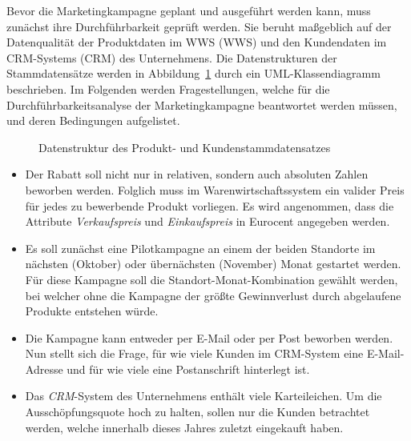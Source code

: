 \documentclass[
  language=german, %
  type=bachelor,%
  ngerman
]{isthesis}
\begin{document}
\begin{content}
  Bevor die Marketingkampagne geplant und ausgeführt werden kann, muss zunächst
  ihre Durchführbarkeit geprüft werden. Sie beruht maßgeblich auf der
  Datenqualität der Produktdaten im \acrlong{WWS} (\acrshort{WWS}) und den
  Kundendaten im \acrlong{CRM}-Systems (\acrshort{CRM}) des Unternehmens. Die
  Datenstrukturen der Stammdatensätze werden in
  Abbildung~\ref{example-use-case-data} durch ein UML-Klassendiagramm
  beschrieben. Im Folgenden werden Fragestellungen, welche für die
  Durchführbarkeitsanalyse der Marketingkampagne beantwortet werden müssen, und
  deren Bedingungen aufgelistet.

  \begin{figure}
    \resizebox{250pt}{!}{}
    \caption{Datenstruktur des Produkt- und Kundenstammdatensatzes}\label{example-use-case-data}
  \end{figure}

  \begin{itemize}

    \item Der Rabatt soll nicht nur in relativen, sondern auch absoluten Zahlen
      beworben werden. Folglich muss im Warenwirtschaftssystem ein valider
      Preis für jedes zu bewerbende Produkt vorliegen. Es wird angenommen, dass
      die Attribute \textit{Verkaufspreis} und \textit{Einkaufspreis} in
      Eurocent angegeben werden.

    \item Es soll zunächst eine Pilotkampagne an einem der beiden Standorte im
      nächsten (Oktober) oder übernächsten (November) Monat gestartet werden.
      Für diese Kampagne soll die Standort-Monat-Kombination gewählt werden,
      bei welcher ohne die Kampagne der größte Gewinnverlust durch abgelaufene
      Produkte entstehen würde.

    \item Die Kampagne kann entweder per E-Mail oder per Post beworben werden.
      Nun stellt sich die Frage, für wie viele Kunden im \acrshort{CRM}-System
      eine E-Mail-Adresse und für wie viele eine Postanschrift hinterlegt ist.

    \item Das \textit{CRM}-System des Unternehmens enthält viele Karteileichen.
      Um die Ausschöpfungsquote hoch zu halten, sollen nur die Kunden
      betrachtet werden, welche innerhalb dieses Jahres zuletzt eingekauft
      haben.

  \end{itemize}


\end{content}
\end{document}
